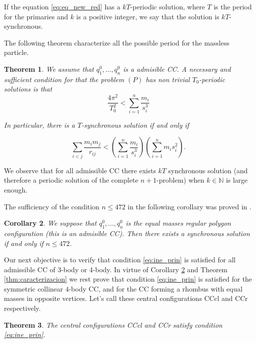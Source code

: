\documentclass[twoside]{article}
\newtheorem{thm}{Theorem}[section]
\newtheorem{cor}[thm]{Corollary}
\theoremstyle{remark}
\begin{document}
If the equation \eqref{eq:eq_new_red} has a $kT$-periodic solution, where $T$ is the period for the primaries and $k$ is a positive integer, we say that the solution is  $kT$-synchronous.

The following theorem characterize all the possible period for the massless particle.

\begin{thm}\label{thm:prin_ine} We assume that $q_1^0,\ldots,q_n^0$ is a admisible CC. A necessary and sufficient condition for that the problem $(P)$ has non trivial $T_0$-periodic solutions is that
\begin{equation}
 \frac{4\pi^2}{T_0^2}<\sum_{i=1}^n\frac{m_i}{s_i^3}
\end{equation}

In particular, there is a $T$-synchronous solution if and only if

\begin{equation}\label{eq:ine_prin}
 \sum_{i<j}\frac{m_im_j}{r_{ij}}<\left(\sum_{i=1}^n\frac{m_i}{s_i^3}\right)\left(\sum_{i=1}^nm_is_i^2\right).
\end{equation}
\end{thm}

We observe that for all admissible CC there exists $kT$ synchronous solution (and therefore a periodic solution of the complete $n+1$-problem) when $k\in \mathbb{N}$ is  large enough.

The sufficiency of the condition $n\leq 472$ in the following corollary  was proved in \cite{li2013characterization}.

\begin{cor}\label{cor:nleq472}
We suppose that $q_1^0,\ldots,q_n^0$ is the equal masses regular polygon configuration  (this is an admisible CC). Then there exists a synchronous solution if and only if $n\leq 472$.
\end{cor}




Our next objective is to verify that condition \eqref{eq:ine_prin} is satisfied for all admissible CC of 3-body or 4-body. In virtue of Corollary \ref{cor:nleq472} and Theorem \ref{thm:caracterizacion}  we rest prove that condition \eqref{eq:ine_prin} is satisfied for the symmetric collinear $4$-body CC, and for the CC forming a rhombus with equal masses in opposite vertices. Let's call these central configurations CCcl and CCr respectively.



\begin{thm}\label{thm:CC.3.4.satis.cond.adm}
The central configurations CCcl and CCr satisfy condition \eqref{eq:ine_prin}.
\end{thm}
\end{document}
